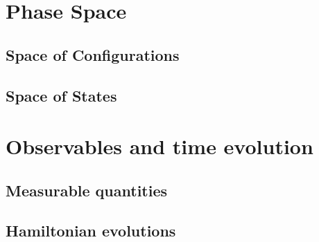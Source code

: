 \documentclass[handout,10pt]{beamer}
\begin{document}

\section{Phase Space}
\checkpoint	
\subsection{Space of Configurations}
	

\subsection{Space of States}
	


\section{Observables and time evolution}
\checkpoint	
\subsection{Measurable quantities}
\subsection{Hamiltonian evolutions}
	
\end{document}
